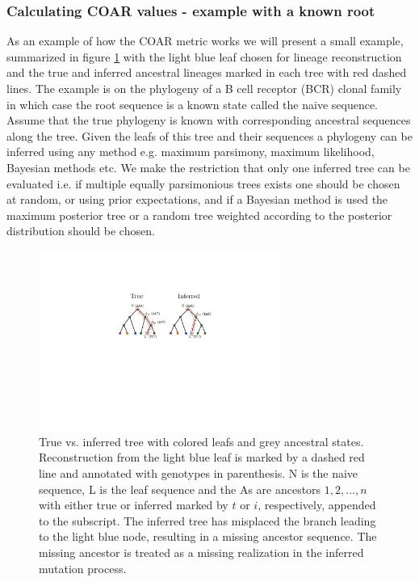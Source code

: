 \subsubsection{Calculating COAR values - example with a known root}
As an example of how the COAR metric works we will present a small example, summarized in figure \ref{fig:ASR_true_vs_inferred} with the light blue leaf chosen for lineage reconstruction and the true and inferred ancestral lineages marked in each tree with red dashed lines.
The example is on the phylogeny of a B cell receptor (BCR) clonal family in which case the root sequence is a known state called the naive sequence.
Assume that the true phylogeny is known with corresponding ancestral sequences along the tree.
Given the leafs of this tree and their sequences a phylogeny can be inferred using any method e.g. maximum parsimony, maximum likelihood, Bayesian methods etc.
We make the restriction that only one inferred tree can be evaluated i.e. if multiple equally parsimonious trees exists one should be chosen at random, or using prior expectations, and if a Bayesian method is used the maximum posterior tree or a random tree weighted according to the posterior distribution should be chosen.

\begin{figure}[ht!]
    \centering
    \includegraphics[width=0.7\textwidth]{figures/ASR_true_vs_inferred.pdf}
    \caption{
        \label{fig:ASR_true_vs_inferred}
        True vs. inferred tree with colored leafs and grey ancestral states. Reconstruction from the light blue leaf is marked by a dashed red line and annotated with genotypes in parenthesis. N is the naive sequence, L is the leaf sequence and the As are ancestors $1,2,...,n$ with either true or inferred marked by $t$ or $i$, respectively, appended to the subscript. The inferred tree has misplaced the branch leading to the light blue node, resulting in a missing ancestor sequence. The missing ancestor is treated as a missing realization in the inferred mutation process.
    }
\end{figure}

